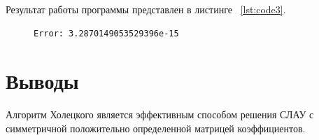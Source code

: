 \documentclass[a4paper, 14pt]{extarticle}
\begin{document}
Результат работы программы представлен в листинге ~\ref{lst:code3}.

\begin{figure}[!htb]
\begin{lstlisting}[caption={Результат работы программы},label={lst:code3}]
Error: 3.2870149053529396e-15
\end{lstlisting}
\end{figure}

\section{Выводы}\label{Sect::conclusion}

Алгоритм Холецкого является эффективным способом решения СЛАУ с симметричной положительно определенной матрицей коэффициентов.
\end{document}
